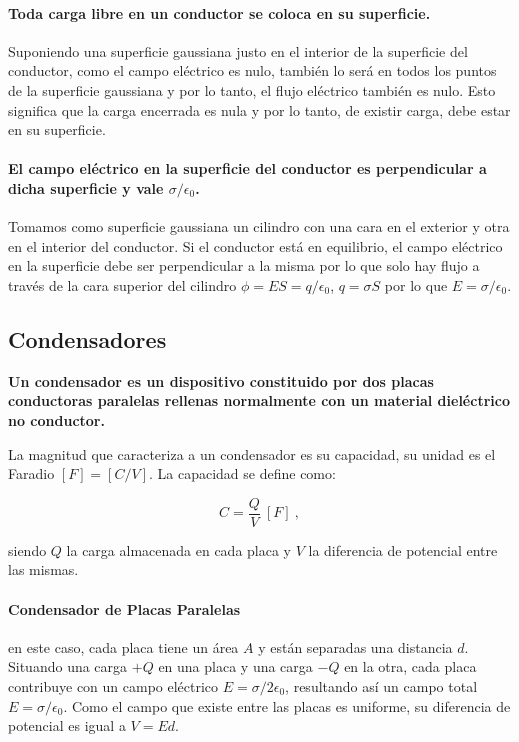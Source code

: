 \documentclass{tufte-handout}
\begin{document}
\paragraph{Toda carga libre en un conductor se coloca en su superficie. } Suponiendo una superficie gaussiana justo en el interior de la superficie del conductor, como el campo eléctrico es nulo, también lo será en todos los puntos de la superficie gaussiana y por lo tanto, el flujo eléctrico también es nulo. Esto significa que la carga encerrada es nula y por lo tanto, de existir carga, debe estar en su superficie.

\paragraph{El campo eléctrico en la superficie del conductor es perpendicular a dicha superficie y vale $\sigma / \epsilon_0$.} Tomamos como superficie gaussiana un cilindro con una cara en el exterior y otra en el interior del conductor. Si el conductor está en equilibrio, el campo eléctrico en la superficie debe ser perpendicular a la misma por lo que solo hay flujo a través de la cara superior del cilindro $\phi = ES = q / \epsilon_0$, $q = \sigma S$ por lo que $E = \sigma / \epsilon_0$.

\subsection{Condensadores}

\textbf{Un condensador es un dispositivo constituido por dos placas conductoras paralelas rellenas normalmente con un material dieléctrico no conductor.}

La magnitud que caracteriza a un condensador es su capacidad, su unidad es el Faradio $[F] = [C/V]$. La capacidad se define como: 

\begin{equation}
C = \frac{Q}{V}~[F]~,
\end{equation}

siendo $Q$ la carga almacenada en cada placa y $V$ la diferencia de potencial entre las mismas.

\paragraph{Condensador de Placas Paralelas} en este caso, cada placa tiene un área $A$ y están separadas una distancia $d$. Situando una carga $+Q$ en una placa y una carga $-Q$ en la otra, cada placa contribuye con un campo eléctrico $E = \sigma/2\epsilon_0$, resultando así un campo total $E = \sigma /\epsilon_0$. Como el campo que existe entre las placas es uniforme, su diferencia de potencial es igual a $V = Ed$.
\end{document}
